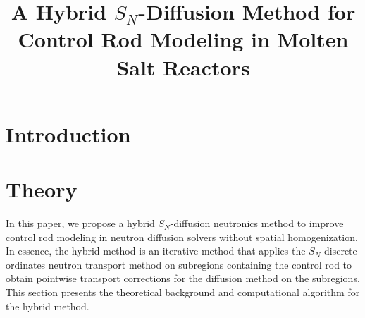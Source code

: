 \documentclass[letterpaper]{mc2025}
\title{A Hybrid $S_N$-Diffusion Method for Control Rod Modeling in Molten Salt Reactors}
\begin{document}
\section{Introduction}\label{sec:1}


\section{Theory} \label{sec:theory}

In this paper, we propose a hybrid $S_N$-diffusion neutronics method to improve control rod
modeling in neutron diffusion solvers without spatial homogenization. In essence, the hybrid
method is an iterative method that applies
the $S_N$ discrete ordinates neutron transport method on subregions containing the control rod to
obtain pointwise transport corrections for the diffusion method on the subregions.
This section presents the theoretical background and computational algorithm for the hybrid method.
\end{document}
